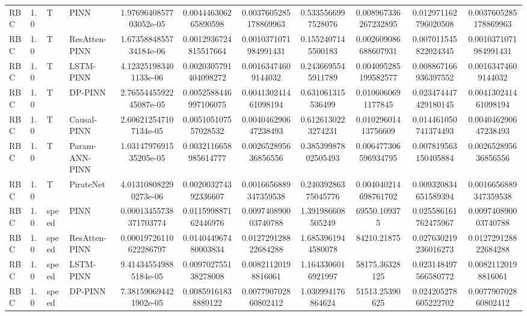 \begin{landscape}
\begin{longtable}{llllccccccc}
 RBC &    1.0 &     T &           PINN & 1.9769640857703052e-05 &   0.004446306265890598 &  0.0037605285178869963 &   0.5335566997528076 &  0.008967336267232895 &  0.012971162796020508 &  0.0037605285178869963 \\
 RBC &    1.0 &     T &  ResAtten-PINN & 1.6735884855734184e-06 &  0.0012936724815517664 &  0.0010371071984991431 &   0.1552407145500183 &  0.002609086688607931 &  0.007011545822024345 &  0.0010371071984991431 \\
 RBC &    1.0 &     T &      LSTM-PINN &  4.123251983401133e-06 &  0.0020305791404098272 &    0.00163474609144032 &   0.2436695545911789 &  0.004095285199582577 &  0.008867166936397552 &    0.00163474609144032 \\
 RBC &    1.0 &     T &        DP-PINN & 2.7655445592245087e-05 &  0.0052588446997106075 &   0.004130241461098194 &    0.631061315536499 &    0.0106060691177845 &  0.023474447429180145 &   0.004130241461098194 \\
 RBC &    1.0 &     T &    Causal-PINN &  2.606212547107134e-05 &   0.005105107557028532 &   0.004046290647238493 &   0.6126130223274231 &   0.01029601413756609 &  0.014461050741374493 &   0.004046290647238493 \\
 RBC &    1.0 &     T & Param-ANN-PINN & 1.0314797691535205e-05 &  0.0032116658985614777 &   0.002652895636856556 &  0.38539987802505493 &  0.006477306596934795 &  0.007819563150405884 &   0.002652895636856556 \\
 RBC &    1.0 &     T &      PirateNet &  4.013108082290273e-06 &   0.002003274392336607 &  0.0016656889347359538 &  0.24039286375045776 &  0.004040214698761702 &  0.009320834651589394 &  0.0016656889347359538 \\
 RBC &    1.0 & speed &           PINN & 0.00013455738371703774 &   0.011599887162446976 &   0.009740890003740788 &    1.391986608505249 &          69550.109375 &  0.025586161762475967 &   0.009740890003740788 \\
 RBC &    1.0 & speed &  ResAtten-PINN & 0.00019726110622286797 &   0.014044967480003834 &   0.012729128822684288 &   1.6853961944580078 &           84210.21875 &  0.027630219236016273 &   0.012729128822684288 \\
 RBC &    1.0 & speed &      LSTM-PINN &  9.414345549885184e-05 &   0.009702755138278008 &    0.00821120198816061 &   1.1643306016921997 &        58175.36328125 &  0.023148497566580772 &    0.00821120198816061 \\
 RBC &    1.0 & speed &        DP-PINN &  7.381590694421902e-05 &    0.00859161838889122 &   0.007790702860802412 &    1.030994176864624 &        51513.25390625 &  0.024205278605222702 &   0.007790702860802412 \\

\end{longtable}
\end{landscape}
